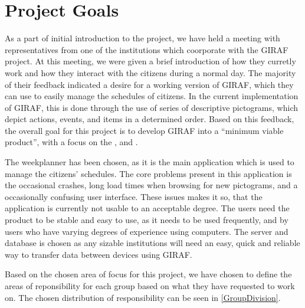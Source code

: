 \section{Project Goals}\label{projectGoals}
As a part of initial introduction to the project, we have held a meeting with
representatives from one of the institutions which coorporate with the GIRAF
project. At this meeting, we were given a brief introduction of how they
curretly work and how they interact with the citizens during a normal day. The
majority of their feedback indicated a desire for a working version of GIRAF,
which they can use to easily manage the schedules of citizens. In the
current implementation of GIRAF, this is done through the use of series of
descriptive pictograms, which depict actions, events, and items in a determined
order. Based on this feedback, the overall goal for this project is to develop
GIRAF into a ``minimum viable product'', with a focus on the
,  and .\nl

The weekplanner has been chosen, as it is the main application which is used
to manage the citizens' schedules. The core problems present in this application is
the occasional crashes, long load times when browsing for new pictograms, and a
occasionally confusing user interface. These issues makes it so, that the
application is currently not usable to an acceptable degree. The users need the
product to be stable and easy to use, as it needs to be used frequently, and by
users who have varying degrees of experience using computers. The server
and database is chosen as any sizable institutions will need an easy, quick and
reliable way to transfer data between devices using GIRAF.\nl

Based on the chosen area of focus for this project, we have chosen to define the
areas of reponsibility for each group based on what they have requested to work
on. The chosen distribution of responsibility can be seen in
\autoref{GroupDivision}.

